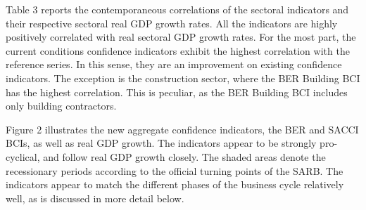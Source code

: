 \documentclass[11pt,]{article}
\begin{document}
Table 3 reports the contemporaneous correlations of the sectoral
indicators and their respective sectoral real GDP growth rates. All the
indicators are highly positively correlated with real sectoral GDP
growth rates. For the most part, the current conditions confidence
indicators exhibit the highest correlation with the reference series. In
this sense, they are an improvement on existing confidence indicators.
The exception is the construction sector, where the BER Building BCI has
the highest correlation. This is peculiar, as the BER Building BCI
includes only building contractors.

\begin{table}[ht]
\centering
\caption{Correlations between sectoral confidence and real sectoral GDP growth} 
\end{table}

Figure 2 illustrates the new aggregate confidence indicators, the BER
and SACCI BCIs, as well as real GDP growth. The indicators appear to be
strongly pro-cyclical, and follow real GDP growth closely. The shaded
areas denote the recessionary periods according to the official turning
points of the SARB. The indicators appear to match the different phases
of the business cycle relatively well, as is discussed in more detail
below.
\end{document}
